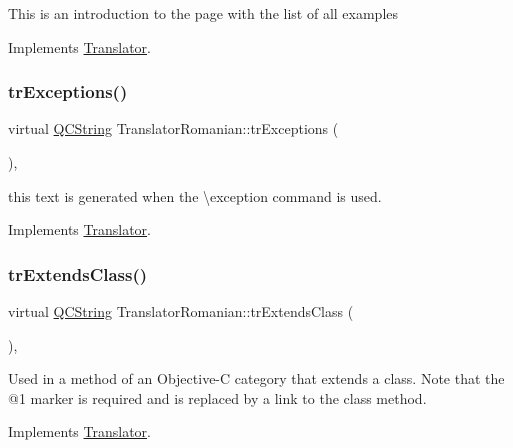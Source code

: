 This is an introduction to the page with the list of all examples 

Implements \mbox{\hyperlink{class_translator}{Translator}}.

\mbox{\label{class_translator_romanian_add5a40d7c001ec777678ce93237bb394}} 
\subsubsection{\texorpdfstring{trExceptions()}{trExceptions()}}
{\footnotesize\ttfamily virtual \mbox{\hyperlink{class_q_c_string}{Q\+C\+String}} Translator\+Romanian\+::tr\+Exceptions (\begin{DoxyParamCaption}{ }\end{DoxyParamCaption})\hspace{0.3cm}{\ttfamily [inline]}, {\ttfamily [virtual]}}

this text is generated when the \textbackslash{}exception command is used. 

Implements \mbox{\hyperlink{class_translator}{Translator}}.

\mbox{\label{class_translator_romanian_a83bac096face5986a9d3603a738258d9}} 
\subsubsection{\texorpdfstring{trExtendsClass()}{trExtendsClass()}}
{\footnotesize\ttfamily virtual \mbox{\hyperlink{class_q_c_string}{Q\+C\+String}} Translator\+Romanian\+::tr\+Extends\+Class (\begin{DoxyParamCaption}{ }\end{DoxyParamCaption})\hspace{0.3cm}{\ttfamily [inline]}, {\ttfamily [virtual]}}

Used in a method of an Objective-\/C category that extends a class. Note that the @1 marker is required and is replaced by a link to the class method. 

Implements \mbox{\hyperlink{class_translator}{Translator}}.

\mbox{\label{class_translator_romanian_a349a6d2104e084d372d4336b6a47c4ee}} 

